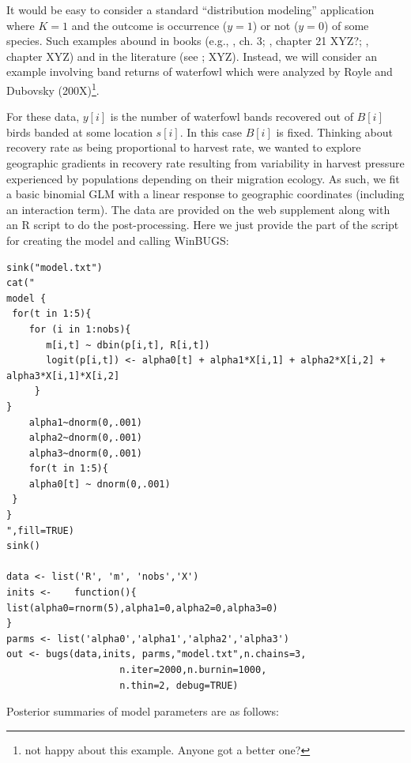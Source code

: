 It would be easy to consider a standard ``distribution modeling''
application where $K=1$ and the outcome is occurrence ($y=1$) or not
($y=0$) of some species. Such examples abound in books (e.g.,
\citet{royle_dorazio:2008}, ch. 3; \citet{kery:2010}, chapter 21 XYZ?;
\citet{kery_schaub:2011}, chapter XYZ) and in the literature (see
\citet{kery_etal:2010}; \citet{kery_etal:2010} XYZ).  Instead, we will consider an example involving band returns of waterfowl which were analyzed by Royle and Dubovsky (200X)\footnote{not happy about this example. Anyone got a better one?}.  

For these data, $y[i]$ is the number of waterfowl bands recovered out of $B[i]$ birds banded at some location $s[i]$. In this case $B[i]$ is fixed. Thinking about recovery rate as being proportional to harvest rate, we wanted to explore geographic gradients in recovery rate resulting from variability in harvest pressure experienced by populations depending on their migration ecology. As such, we fit a basic binomial GLM with a linear response to geographic coordinates (including an interaction term). The data are provided on the web supplement along with an R script to do the post-processing. Here we just provide the part of the script for creating the model and calling WinBUGS:

\begin{verbatim}
sink("model.txt")
cat("
model {
 for(t in 1:5){
    for (i in 1:nobs){
       m[i,t] ~ dbin(p[i,t], R[i,t])
       logit(p[i,t]) <- alpha0[t] + alpha1*X[i,1] + alpha2*X[i,2] + alpha3*X[i,1]*X[i,2]
     }
}
	alpha1~dnorm(0,.001)
	alpha2~dnorm(0,.001)
	alpha3~dnorm(0,.001)
	for(t in 1:5){
 	alpha0[t] ~ dnorm(0,.001)  
 }
}
",fill=TRUE)
sink()

data <- list('R', 'm', 'nobs','X')
inits <- 	function(){
list(alpha0=rnorm(5),alpha1=0,alpha2=0,alpha3=0)
}
parms <- list('alpha0','alpha1','alpha2','alpha3')
out <- bugs(data,inits, parms,"model.txt",n.chains=3,
 					n.iter=2000,n.burnin=1000,
					n.thin=2, debug=TRUE)
\end{verbatim}

Posterior summaries of model parameters are as follows:

